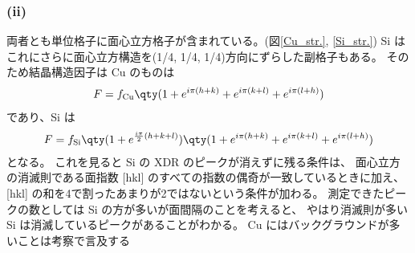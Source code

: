 \documentclass[11pt,dvipdfmx,a4paper]{jsarticle}
\begin{document}
\subsubsection*{(ii)}
両者とも単位格子に面心立方格子が含まれている。(図\ref{Cu_str.}, \ref{Si_str.})
Si はこれにさらに面心立方構造を(1/4, 1/4, 1/4)方向にずらした副格子もある。%
そのため結晶構造因子は Cu のものは
\begin{align}
	F = f_{\text{Cu}}\qty(1+e^{i\pi(h+k)}+e^{i\pi(k+l)}+e^{i\pi(l+h)})
\end{align}
であり、Si は
\begin{align}
	F = f_{\text{Si}}\qty(1+e^{\frac{i\pi}{2}(h+k+l)})\qty(1+e^{i\pi(h+k)}+e^{i\pi(k+l)}+e^{i\pi(l+h)})
\end{align}
となる。
これを見ると Si の XDR のピークが消えずに残る条件は、
面心立方の消滅則である面指数 [hkl] のすべての指数の偶奇が一致しているときに加え、
[hkl] の和を4で割ったあまりが2ではないという条件が加わる。
測定できたピークの数としては Si の方が多いが面間隔のことを考えると、
やはり消滅則が多い Si は消滅しているピークがあることがわかる。%
Cu にはバックグラウンドが多いことは考察で言及する\\ %
\end{document}
